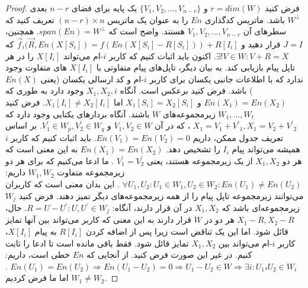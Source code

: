 \begin{proof}
    فرض کنید 
    $r = dim(W)$
     و $\{V_1, V_2, \ldots, V_{n - r} \}$ 
     یک پایه برای فضای $n - r$ بعدی $W^\bot$ باشد. ماتریس کدگذاری $En$ را به عنوان یک ماتریس 
     $(n - r) \times n $
      تعریف کنید که سطرهای آن 
      $V_1, V_2, \ldots, V_{n - r}$
       هستند. واضح است که 
      $span(En) = W^\bot$.
       همچنین، $J = I$ قرار دهید و 
       $\overrightarrow{f}_i(\overrightarrow{R}, En(X[S_i]) = f(En(X[S_i] - R[S_i])) + R[I_i]$ که $\exists! V \in W: V + R = X $.
    اکنون باید اثبات کنیم که کاربر $i$-ام می‌تواند $X[I_i]$ را در هر تاپل پیام بازیابی کند. به بیان دیگر، تاپل‌های پیام متفاوتی با 
    $X[I_i]$‌
    های متفاوت وجود ندارد که با اطلاعات جانبی یکسان برای کاربر
     $i$-ام
      و کد ارسالی یکسان (یعنی
       $En(X)$
       ) باشد. فرض کنید برعکس است. آنگاه 
     $X_1, X_2, i$ وجود دارد به طوری که 
     $En(X_1) = En(X_2)$ و 
     $X_1[S_i] = X_2[S_i]$ اما 
     $X_1[I_i] \neq X_2[I_i]$. فرض کنید 
     $W_1, \ldots, W_t$ زیرمجموعه‌های 
     $W$ باشند. آنگاه بردارهای یکتایی وجود دارد که 
     $X_1 = V_1 + {V^\prime}_1, X_1 = V_2 + {V^\prime}_2$
     ، که در آن 
     $V_1, V_2 \in W$
      و 
      $V^\prime_1 \in W_p, V^\prime_2 \in W_q$.
    بر اساس تعریف جدول ممکن، داریم
     $En(V_1) = En(V_2) = 0$.
    باید اثبات کنیم که کاربر $i$ همیشه می‌تواند پیام $I_i$ را تشخیص دهد. 
    $En(X_1) = En(X_2)$
     به این معنی است که هر دو 
    $X_1, X_2$
     از یک زیرمجموعه هستند، یعنی 
    $V^\prime_1 = V^\prime_2$
    . ما ادعا می‌کنیم که برای هر دو زیرمجموعه متفاوت $W_1, W_2$ داریم: 
    $\forall U_1, U_2: U_1 \in W_1, U_2 \in W_2: En(U_1) \neq En(U_2)$
    . این بدان معنی است که کاربران می‌توانند زیرمجموعه تاپل پیام را از همه زیرمجموعه‌های دیگر تمیز دهند. فرض کنید $W_j$ زیرمجموعه‌ای باشد که 
    $X_1, X_2$
     در آن قرار دارند، آنگاه: 
     $R = U - U^\prime: U, U^\prime \in W_j$. 
     حال، 
     $X_1 - R, X_2 - R$ 
     هر دو در $W$ قرار دارند به این معنی که کاربر می‌تواند بین آنها تمایز قائل شود. اما این یک تناقض است زیرا پس از اضافه کردن $R[I_i]$ به پیام $X[I_i]$، کاربر $i$-ام می‌تواند بین $X_1, X_2$ تمایز قائل شود.
    فقط باقی مانده است تا ادعا را ثابت کنیم. در غیر این صورت فرض کنید. از آنجایی که $En$ خطی است، داریم: 
    $En(U_1) = En(U_2) \Rightarrow En(U_1 - U_2) = 0 \Rightarrow U_1 - U_2 \in W \Rightarrow \exists i: U_1، U_2 \in W_i$
    . اما ما فرض کردیم
     $W_1 \neq W_2$.
\end{proof}

